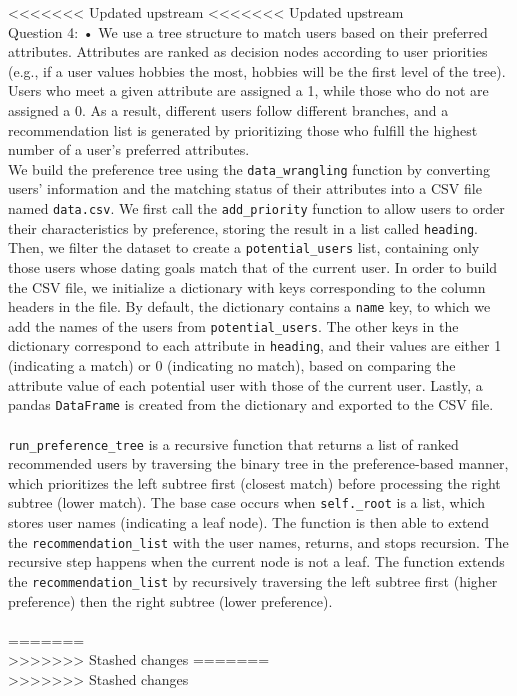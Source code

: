\documentclass[fontsize=11pt]{article}
\begin{document}
<<<<<<< Updated upstream
<<<<<<< Updated upstream
\\
Question 4:
	• We use a tree structure to match users based on their preferred attributes. Attributes are ranked as decision nodes according to user priorities (e.g., if a user values hobbies the most, hobbies will be the first level of the tree). Users who meet a given attribute are assigned a 1, while those who do not are assigned a 0. As a result, different users follow different branches, and a recommendation list is generated by prioritizing those who fulfill the highest number of a user's preferred attributes.
\\
We build the preference tree using the \texttt{data\_wrangling} function by converting users' information and the matching status of their attributes into a CSV file named \texttt{data.csv}. We first call the \texttt{add\_priority} function to allow users to order their characteristics by preference, storing the result in a list called \texttt{heading}. Then, we filter the dataset to create a \texttt{potential\_users} list, containing only those users whose dating goals match that of the current user. In order to build the CSV file, we initialize a dictionary with keys corresponding to the column headers in the file. By default, the dictionary contains a \texttt{name} key, to which we add the names of the users from \texttt{potential\_users}. The other keys in the dictionary correspond to each attribute in \texttt{heading}, and their values are either 1 (indicating a match) or 0 (indicating no match), based on comparing the attribute value of each potential user with those of the current user. Lastly, a pandas \texttt{DataFrame} is created from the dictionary and exported to the CSV file.
\\
\\
\texttt{run\_preference\_tree} is a recursive function that returns a list of ranked recommended users by traversing the binary tree in the preference-based manner, which prioritizes the left subtree first (closest match) before processing the right subtree (lower match). The base case occurs when \texttt{self.\_root} is a list, which stores user names (indicating a leaf node). The function is then able to extend the \texttt{recommendation\_list} with the user names, returns, and stops recursion. The recursive step happens when the current node is not a leaf. The function extends the \texttt{recommendation\_list} by recursively traversing the left subtree first (higher preference) then the right subtree (lower preference).
\\
\\
=======
\\ 
>>>>>>> Stashed changes
=======
\\ 
>>>>>>> Stashed changes
\end{document}
